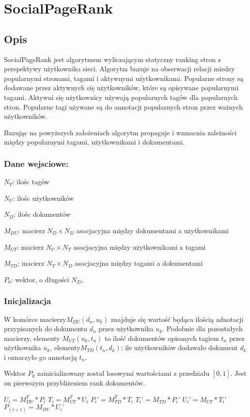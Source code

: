 \chapter{SocialPageRank}
\section{Opis}
SocialPageRank jest algorytmem wyliczającym statyczny ranking stron z perspektywy użytkownika sieci. Algorytm bazuje na obserwacji relacji miedzy popularnymi stronami, tagami i aktywnymi użytkownikami. Popularne strony są dodawane przez aktywnych się użytkowników, które są opisywane popularnymi tagami. Aktywni się użytkownicy używają popularnych tagów dla popularnych stron. Popularne tagi używane są do annotacji popularnych stron przez ważnych użytkowników.

Bazując na powyższych założeniach algorytm propaguje i wzmacnia zależności między popularnymi tagami, użytkownikami i dokumentami. 
\subsection*{Dane wejsciowe:}
$N_T$: ilośc tagów

$N_U$: ilośc użytkowników

$N_D$: ilośc dokumentów

$M_{DU}$: macierz $N_D \times N_D$ asocjacyjna między dokumentami a użytkownikami

$M_{UT}$: macierz $N_U \times N_T$  asocjacyjna między użytkownikami a tagami

$M_{TD}$: macierz $N_T \times N_D$ asocjacyjna między tagami a dokumentami

$P_0$: wektor, o długości $N_D$, 

\subsection*{Inicjalizacja}
W komórce macierzy$M_{DU}(d_n, u_k)$ znajduje się wartość będąca ilością adnotacji przypisanych do dokumentu $d_n$ przez użytkownika $u_k$. Podobnie dla pozostałych macierzy, elementy $M_{UT}(u_k, t_n)$ to ilość dokumentów opisanych tagiem $t_n$ przez użytkownika $u_k$, elementy$M_{TD}(t_n, d_k)$: ile użytkowników dodawało dokument $d_k$ i oznaczyło go annotacją $t_n$. 

Wektor $P_0$ zainicializowany został losowymi wartościami z przedziału $[0,1]$. Jest on pierwszym przybliżeniem rank dokumentów.


\begin{algorithmic}
\REPEAT
\STATE $U_i = M_{DU}^T * P_i$
\STATE $T_i = M_{UT}^T * U_i$
\STATE $P_i’ = M_{TD}^T * T_i$
\STATE $T_i’ = M_{TD}  * P_i’$
\STATE $U_i’ = M_{UT} * T_i’$
\STATE $P_(i+1) = M_{DU} * U_i’$

\end{algorithmic}

